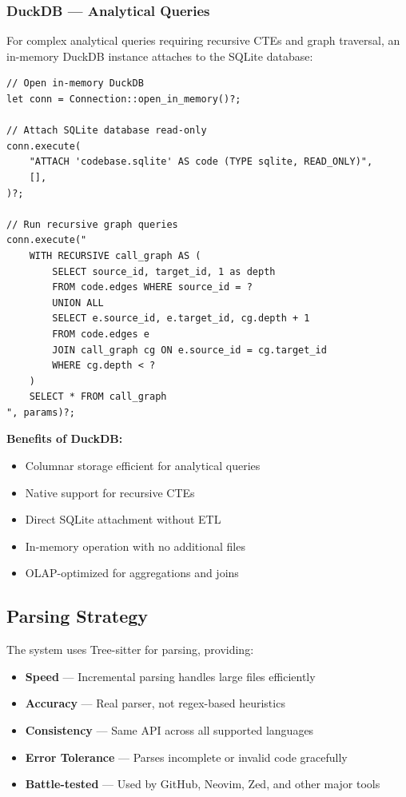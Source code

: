 \subsubsection{DuckDB --- Analytical Queries}

For complex analytical queries requiring recursive CTEs and graph traversal, an in-memory DuckDB instance attaches to the SQLite database:

\begin{lstlisting}[style=rustcode, caption={DuckDB integration pattern}]
// Open in-memory DuckDB
let conn = Connection::open_in_memory()?;

// Attach SQLite database read-only
conn.execute(
    "ATTACH 'codebase.sqlite' AS code (TYPE sqlite, READ_ONLY)",
    [],
)?;

// Run recursive graph queries
conn.execute("
    WITH RECURSIVE call_graph AS (
        SELECT source_id, target_id, 1 as depth
        FROM code.edges WHERE source_id = ?
        UNION ALL
        SELECT e.source_id, e.target_id, cg.depth + 1
        FROM code.edges e
        JOIN call_graph cg ON e.source_id = cg.target_id
        WHERE cg.depth < ?
    )
    SELECT * FROM call_graph
", params)?;
\end{lstlisting}

\textbf{Benefits of DuckDB:}
\begin{itemize}
    \item Columnar storage efficient for analytical queries
    \item Native support for recursive CTEs
    \item Direct SQLite attachment without ETL
    \item In-memory operation with no additional files
    \item OLAP-optimized for aggregations and joins
\end{itemize}

\subsection{Parsing Strategy}

The system uses Tree-sitter for parsing, providing:

\begin{itemize}
    \item \textbf{Speed} --- Incremental parsing handles large files efficiently
    \item \textbf{Accuracy} --- Real parser, not regex-based heuristics
    \item \textbf{Consistency} --- Same API across all supported languages
    \item \textbf{Error Tolerance} --- Parses incomplete or invalid code gracefully
    \item \textbf{Battle-tested} --- Used by GitHub, Neovim, Zed, and other major tools
\end{itemize}

